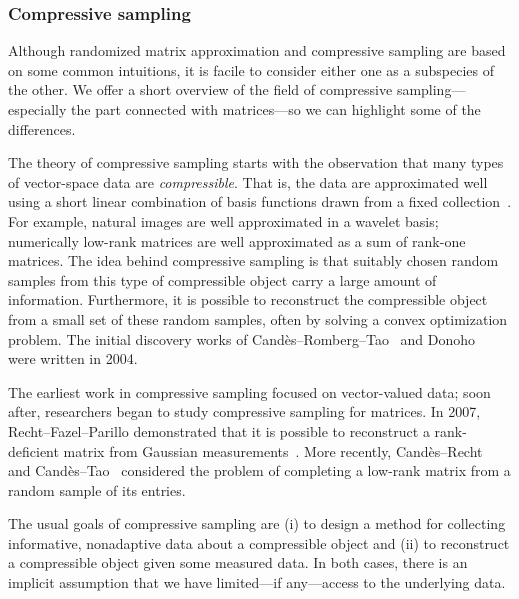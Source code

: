 \documentclass[final]{siamltex}
\newcommand{\pgnotate}[1]{{\color{blue}[#1]}}
\begin{document}
\subsubsection{Compressive sampling}

Although randomized matrix approximation and compressive sampling
are based on some common intuitions, it is facile to consider either
one as a subspecies of the other. We offer a short overview of the
field of compressive sampling---especially the part connected with
matrices---so we can highlight some of the differences.

The theory of compressive sampling starts with the observation that
many types of vector-space data are \emph{compressible}.  That is,
the data are approximated well using a short linear combination of
basis functions drawn from a %
fixed collection~\cite{DVDD98:Data-Compression}. For example, natural
images are well approximated in a wavelet basis; numerically
low-rank matrices are well approximated as a sum of rank-one
matrices.  The idea behind compressive sampling is that suitably
chosen random samples from this type of compressible object carry a
large amount of information. Furthermore, it is possible to
reconstruct the compressible object from a small set of these random
samples, often by solving a convex optimization problem. The initial
discovery works of
Cand{\`e}s--Romberg--Tao~\cite{CRT06:Robust-Uncertainty} and
Donoho~\cite{Don06:Compressed-Sensing} were written in 2004.

The earliest work in compressive sampling focused on vector-valued
data; soon after, researchers began to study compressive sampling
for matrices. In 2007, Recht--Fazel--Parillo demonstrated that it is
possible to reconstruct a rank-deficient matrix from
Gaussian measurements~\cite{RFP09:Guaranteed-Minimum}.
More recently, Cand{\`e}s--Recht~\cite{CR08:Exact-Matrix} and Cand{\`e}s--Tao~\cite{CT09:Power-Convex}
considered the problem of completing a low-rank matrix from a random sample of its entries.

The usual goals of compressive sampling are
(i) to design a method for collecting informative, nonadaptive data about
a compressible object and (ii) to reconstruct a compressible object given
some measured data.  In both cases, there is an implicit assumption that we
have limited---if any---access to the underlying data.
\end{document}
